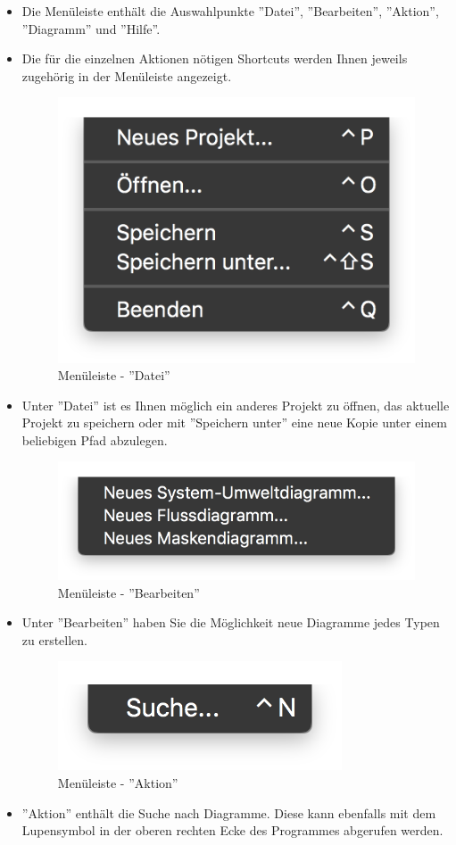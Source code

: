 \begin{itemize}
\item Die Menüleiste enthält die Auswahlpunkte ''Datei'', ''Bearbeiten'', ''Aktion'', ''Diagramm'' und ''Hilfe''.
\item Die für die einzelnen Aktionen nötigen Shortcuts werden Ihnen jeweils zugehörig in der Menüleiste angezeigt. 

\begin{figure}[h!]
	\centering
	\includegraphics[width=.4\textwidth]{Leiste_Datei.png}
	\caption{Menüleiste - ''Datei''}
\end{figure}

\item Unter ''Datei'' ist es Ihnen möglich ein anderes Projekt zu öffnen, das aktuelle Projekt zu speichern oder mit ''Speichern unter'' eine neue Kopie unter einem beliebigen Pfad abzulegen.

\begin{figure}[h!]
	\centering
	\includegraphics[width=.4\textwidth]{Leiste_Bearbeiten.png}
	\caption{Menüleiste - ''Bearbeiten''}
\end{figure}

\item Unter ''Bearbeiten'' haben Sie die Möglichkeit neue Diagramme jedes Typen zu erstellen.

\begin{figure}[h!]
	\centering
	\includegraphics[width=.4\textwidth]{Leiste_Aktion.png}
	\caption{Menüleiste - ''Aktion''}
\end{figure}

\item ''Aktion'' enthält die Suche nach Diagramme. Diese kann ebenfalls mit dem Lupensymbol in der oberen rechten Ecke des Programmes abgerufen werden.


\end{itemize}
